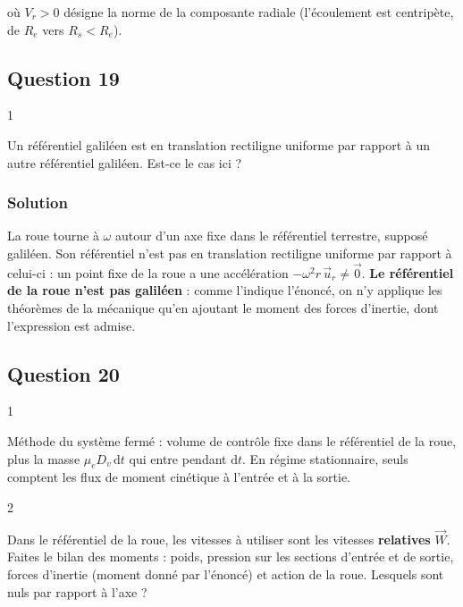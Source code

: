 \documentclass[11pt,a4paper]{article}
\begin{document}
où \(V_r>0\) désigne la norme de la composante radiale (l'écoulement est centripète, de \(R_e\) vers \(R_s<R_e\)).

\hypertarget{question-19}{%
\subsection{Question 19}\label{question-19}}

\begin{indication}{1}

Un référentiel galiléen est en translation rectiligne uniforme par rapport à un autre référentiel galiléen. Est-ce le cas ici ?

\end{indication}

\hypertarget{solution-18}{%
\subsubsection{Solution}\label{solution-18}}

La roue tourne à \(\omega\) autour d'un axe fixe dans le référentiel terrestre, supposé galiléen. Son référentiel n'est pas en translation rectiligne uniforme par rapport à celui-ci : un point fixe de la roue a une accélération \(-\omega^2r\,\vec u_r\neq\vec 0\). \textbf{Le référentiel de la roue n'est pas galiléen} : comme l'indique l'énoncé, on n'y applique les théorèmes de la mécanique qu'en ajoutant le moment des forces d'inertie, dont l'expression est admise.

\hypertarget{question-20}{%
\subsection{Question 20}\label{question-20}}

\begin{indication}{1}

Méthode du système fermé : volume de contrôle fixe dans le référentiel de la roue, plus la masse \(\mu_eD_v\,\mathrm dt\) qui entre pendant \(\mathrm dt\). En régime stationnaire, seuls comptent les flux de moment cinétique à l'entrée et à la sortie.

\end{indication}

\begin{indication}{2}

Dans le référentiel de la roue, les vitesses à utiliser sont les vitesses \textbf{relatives} \(\vec W\). Faites le bilan des moments : poids, pression sur les sections d'entrée et de sortie, forces d'inertie (moment donné par l'énoncé) et action de la roue. Lesquels sont nuls par rapport à l'axe ?

\end{indication}
\end{document}
